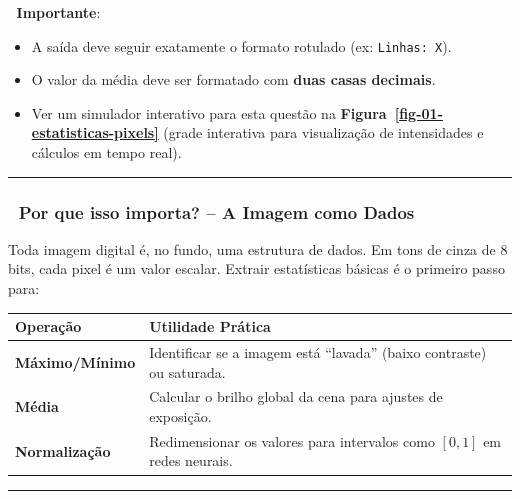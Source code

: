 \documentclass[
  portuguese,
  letterpaper,
  openany,
  oneside,
  12pt,
  a4paper]{book}
\providecommand{\tightlist}{%
  \setlength{\itemsep}{0pt}\setlength{\parskip}{0pt}}
\begin{document}
📌 \textbf{Importante}:

\begin{itemize}
\tightlist
\item
  A saída deve seguir exatamente o formato rotulado (ex:
  \texttt{Linhas:\ X}).
\item
  O valor da média deve ser formatado com \textbf{duas casas decimais}.
\item
  Ver um simulador interativo para esta questão na
  \textbf{Figura~\ref{fig-01-estatisticas-pixels}} (grade interativa
  para visualização de intensidades e cálculos em tempo real).
\end{itemize}

\begin{center}\rule{0.5\linewidth}{0.5pt}\end{center}

\subsubsection{🧠 Por que isso importa? -- A Imagem como
Dados}\label{por-que-isso-importa-a-imagem-como-dados}

Toda imagem digital é, no fundo, uma estrutura de dados. Em tons de
cinza de 8 bits, cada pixel é um valor escalar. Extrair estatísticas
básicas é o primeiro passo para:

\begin{longtable}[]{@{}
  >{\raggedright\arraybackslash}p{}
  >{\raggedright\arraybackslash}p{}@{}}
\toprule\noalign{}
\begin{minipage}[b]{\linewidth}\raggedright
Operação
\end{minipage} & \begin{minipage}[b]{\linewidth}\raggedright
Utilidade Prática
\end{minipage} \\
\midrule\noalign{}
\endhead
\bottomrule\noalign{}
\endlastfoot
\textbf{Máximo/Mínimo} & Identificar se a imagem está ``lavada'' (baixo
contraste) ou saturada. \\
\textbf{Média} & Calcular o brilho global da cena para ajustes de
exposição. \\
\textbf{Normalização} & Redimensionar os valores para intervalos como
\([0, 1]\) em redes neurais. \\
\end{longtable}

\begin{center}\rule{0.5\linewidth}{0.5pt}\end{center}
\end{document}
